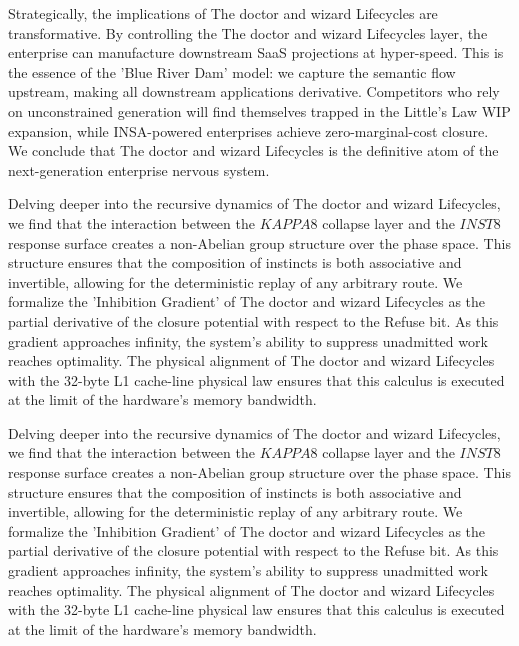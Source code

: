 \documentclass[12pt,a4paper,oneside]{book}
\begin{document}
Strategically, the implications of The doctor and wizard Lifecycles are transformative. By controlling the The doctor and wizard Lifecycles layer, the enterprise can manufacture downstream SaaS projections at hyper-speed. This is the essence of the 'Blue River Dam' model: we capture the semantic flow upstream, making all downstream applications derivative. Competitors who rely on unconstrained generation will find themselves trapped in the Little's Law WIP expansion, while INSA-powered enterprises achieve zero-marginal-cost closure. We conclude that The doctor and wizard Lifecycles is the definitive atom of the next-generation enterprise nervous system. 

Delving deeper into the recursive dynamics of The doctor and wizard Lifecycles, we find that the interaction between the $KAPPA8$ collapse layer and the $INST8$ response surface creates a non-Abelian group structure over the phase space. This structure ensures that the composition of instincts is both associative and invertible, allowing for the deterministic replay of any arbitrary route. We formalize the 'Inhibition Gradient' of The doctor and wizard Lifecycles as the partial derivative of the closure potential with respect to the Refuse bit. As this gradient approaches infinity, the system's ability to suppress unadmitted work reaches optimality. The physical alignment of The doctor and wizard Lifecycles with the 32-byte L1 cache-line physical law ensures that this calculus is executed at the limit of the hardware's memory bandwidth. 

Delving deeper into the recursive dynamics of The doctor and wizard Lifecycles, we find that the interaction between the $KAPPA8$ collapse layer and the $INST8$ response surface creates a non-Abelian group structure over the phase space. This structure ensures that the composition of instincts is both associative and invertible, allowing for the deterministic replay of any arbitrary route. We formalize the 'Inhibition Gradient' of The doctor and wizard Lifecycles as the partial derivative of the closure potential with respect to the Refuse bit. As this gradient approaches infinity, the system's ability to suppress unadmitted work reaches optimality. The physical alignment of The doctor and wizard Lifecycles with the 32-byte L1 cache-line physical law ensures that this calculus is executed at the limit of the hardware's memory bandwidth. 
\end{document}
